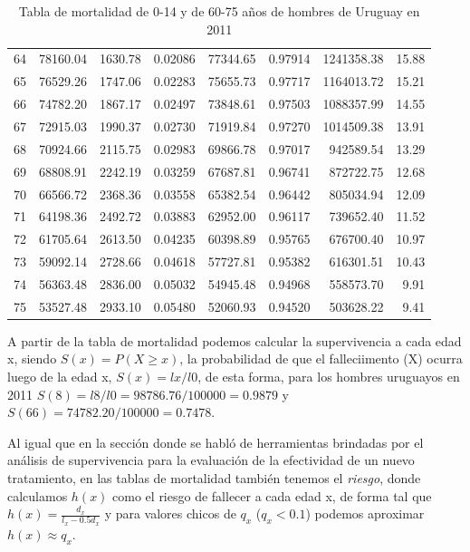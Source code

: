 \documentclass[12pt]{article}
\begin{document}
\begin{table}[htbp]
\begin{tabular}{lrrrrrrr}
 64 & 78160.04 & 1630.78 & 0.02086 & 77344.65 & 0.97914 & 1241358.38 & 15.88 \\ 
 65 & 76529.26 & 1747.06 & 0.02283 & 75655.73 & 0.97717 & 1164013.72 & 15.21 \\ 
 66 & 74782.20 & 1867.17 & 0.02497 & 73848.61 & 0.97503 & 1088357.99 & 14.55 \\ 
 67 & 72915.03 & 1990.37 & 0.02730 & 71919.84 & 0.97270 & 1014509.38 & 13.91 \\ 
 68 & 70924.66 & 2115.75 & 0.02983 & 69866.78 & 0.97017 & 942589.54 & 13.29 \\ 
 69 & 68808.91 & 2242.19 & 0.03259 & 67687.81 & 0.96741 & 872722.75 & 12.68 \\ 
 70 & 66566.72 & 2368.36 & 0.03558 & 65382.54 & 0.96442 & 805034.94 & 12.09 \\ 
 71 & 64198.36 & 2492.72 & 0.03883 & 62952.00 & 0.96117 & 739652.40 & 11.52 \\ 
 72 & 61705.64 & 2613.50 & 0.04235 & 60398.89 & 0.95765 & 676700.40 & 10.97 \\ 
 73 & 59092.14 & 2728.66 & 0.04618 & 57727.81 & 0.95382 & 616301.51 & 10.43 \\ 
 74 & 56363.48 & 2836.00 & 0.05032 & 54945.48 & 0.94968 & 558573.70 & 9.91 \\ 
 75 & 53527.48 & 2933.10 & 0.05480 & 52060.93 & 0.94520 & 503628.22 & 9.41 \\ 
   \hline   
\end{tabular}
\caption{Tabla de mortalidad de 0-14 y de 60-75 años de hombres de Uruguay en 2011}
\label{tabla:6}
\end{table}

A partir de la tabla de mortalidad podemos calcular la supervivencia a cada edad x, siendo $S(x)=P(X\geq x)$, la probabilidad de que el falleciimento (X) ocurra luego de la edad x, $S(x)=lx/l0$, de esta forma, para los hombres uruguayos en 2011 $S(8)=l8/l0=98786.76/100000=0.9879$ y $S(66)=74782.20/100000=0.7478$.\

Al igual que en la sección donde se habló de herramientas brindadas por el análisis de supervivencia para la evaluación de la efectividad de un nuevo tratamiento, en las tablas de mortalidad también tenemos el \textit{riesgo}, donde calculamos $h(x)$ como el riesgo de fallecer a cada edad x, de forma tal que $h(x)=\frac{d_x}{l_x-0.5d_x}$ y para valores chicos de $q_x$ ($q_x<0.1$) podemos aproximar $h(x)\approx q_x$.\\
\end{document}
